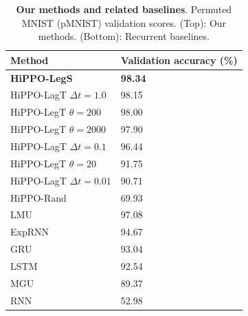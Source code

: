 \documentclass[../hippo.tex]{subfiles}
\begin{document}
\begin{table}[ht]%
  \caption{
    \textbf{Our methods and related baselines}. Permuted MNIST (pMNIST) validation scores. (Top): Our methods. (Bottom): Recurrent baselines.
  }
    \centering
    \begin{tabular}{@{}ll@{}}
      \toprule
      Method                     & Validation accuracy (\%) \\
      \midrule
      \textbf{HiPPO-LegS}        & \textbf{98.34}           \\
      HiPPO-LagT $\Delta t = 1.0$           & 98.15                    \\
      HiPPO-LegT $\theta = 200$  & 98.00                     \\
      HiPPO-LegT $\theta = 2000$ & 97.90                     \\
      HiPPO-LagT $\Delta t = 0.1$           & 96.44                    \\
      HiPPO-LegT $\theta = 20$   & 91.75                    \\
      HiPPO-LagT $\Delta t = 0.01$           & 90.71                    \\
      HiPPO-Rand                 & 69.93 \\
      \midrule
      LMU                        & 97.08                    \\
      ExpRNN                     & 94.67                    \\
      GRU                        & 93.04                    \\
      LSTM                       & 92.54                    \\
      MGU                        & 89.37                    \\
      RNN                        & 52.98                    \\
      \bottomrule
    \end{tabular}
    \label{tab:pmnist-val}
  \end{table}
\end{document}
